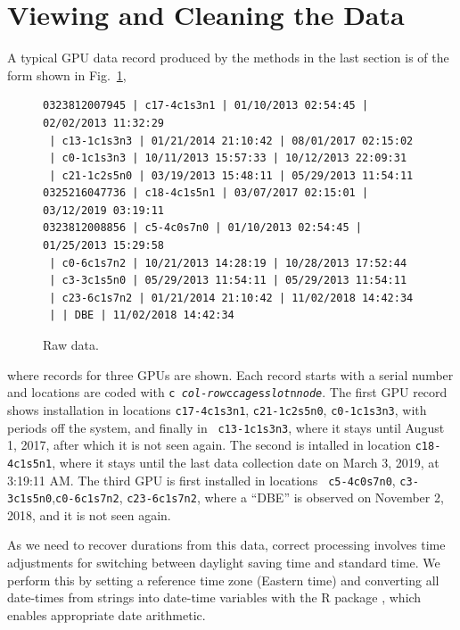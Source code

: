 \section{Viewing and Cleaning the Data}
\label{sec:clean}

A typical GPU data record produced by the methods in the last section
is of the form shown in Fig.~\ref{fig:dataraw},
\begin{figure}
{\small
\begin{verbatim}
0323812007945 | c17-4c1s3n1 | 01/10/2013 02:54:45 | 02/02/2013 11:32:29
 | c13-1c1s3n3 | 01/21/2014 21:10:42 | 08/01/2017 02:15:02
 | c0-1c1s3n3 | 10/11/2013 15:57:33 | 10/12/2013 22:09:31
 | c21-1c2s5n0 | 03/19/2013 15:48:11 | 05/29/2013 11:54:11
0325216047736 | c18-4c1s5n1 | 03/07/2017 02:15:01 | 03/12/2019 03:19:11
0323812008856 | c5-4c0s7n0 | 01/10/2013 02:54:45 | 01/25/2013 15:29:58
 | c0-6c1s7n2 | 10/21/2013 14:28:19 | 10/28/2013 17:52:44
 | c3-3c1s5n0 | 05/29/2013 11:54:11 | 05/29/2013 11:54:11
 | c23-6c1s7n2 | 01/21/2014 21:10:42 | 11/02/2018 14:42:34
 | | DBE | 11/02/2018 14:42:34
\end{verbatim}
}
\caption{Raw data.}
\label{fig:dataraw}
\end{figure}
\noindent where records for three GPUs are shown. Each record starts
with a serial number and locations are coded with {\tt c{\it
    col-row}c{\it cage}s{\it slot}n{\it node}}. The first GPU record
shows installation in locations {\tt c17-4c1s3n1}, {\tt c21-1c2s5n0},
{\tt c0-1c1s3n3}, with periods off the system, and finally in {\tt
  c13-1c1s3n3}, where it stays until August 1, 2017, after which it is
not seen again. The second is intalled in location {\tt c18-4c1s5n1},
where it stays until the last data collection date on March 3, 2019,
at 3:19:11 AM. The third GPU is first installed in locations {\tt
  c5-4c0s7n0}, {\tt c3-3c1s5n0},{\tt c0-6c1s7n2}, {\tt c23-6c1s7n2},
where a ``DBE'' is observed on November 2, 2018, and it is not seen
again.

As we need to recover durations from this data, correct processing
involves time adjustments for switching between daylight saving time
and standard time. We perform this by setting a reference time zone
(Eastern time) and converting all date-times from strings into
date-time variables  with the R
 package \cite{lubridate}, which enables appropriate
date arithmetic.

